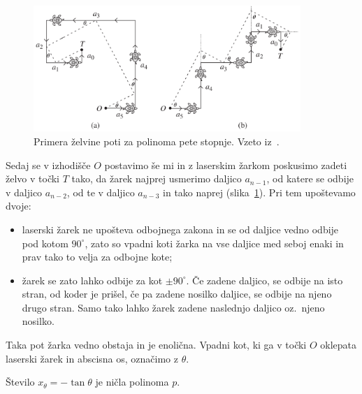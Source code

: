 \begin{figure}[h]
    \centering
    \includegraphics[width=0.9\textwidth]{images/kubična enačba/primera_zelvine_poti.png}
    \caption[Primera želvine poti]{Primera želvine poti za polinoma pete stopnje. Vzeto iz~\cite[str.\ 311]{hull2011}.}
    \label{fig:primera_zelve}
\end{figure}

Sedaj se v izhodišče $O$ postavimo še mi in z laserskim žarkom poskusimo zadeti želvo v točki $T$ tako, da žarek najprej usmerimo daljico $a_{n-1}$, od katere se odbije v daljico $a_{n-2}$, od te v daljico $a_{n-3}$ in tako naprej (slika~\ref{fig:primera_zelve}). Pri tem upoštevamo dvoje:
\begin{itemize}
    \item laserski žarek ne upošteva odbojnega zakona in se od daljice vedno odbije pod kotom $90^\circ$, zato so vpadni koti žarka na vse daljice med seboj enaki in prav tako to velja za odbojne kote;
    \item žarek se zato lahko odbije za kot $\pm 90^\circ$. Če zadene daljico, se odbije na isto stran, od koder je prišel, če pa zadene nosilko daljice, se odbije na njeno drugo stran. Samo tako lahko žarek zadene naslednjo daljico oz.\ njeno nosilko.
\end{itemize}
Taka pot žarka vedno obstaja in je enolična. Vpadni kot, ki ga v točki $O$ oklepata laserski žarek in abscisna os, označimo z $\theta$.

\begin{trditev}
    Število $x_{\theta} = - \tan \theta$ je ničla polinoma $p$.
\end{trditev}

